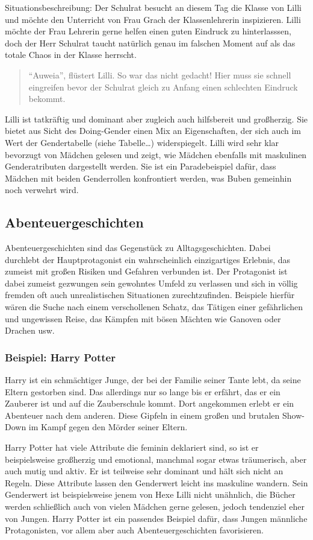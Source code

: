 Situationsbeschreibung: Der Schulrat besucht an diesem Tag die Klasse
von Lilli und möchte den Unterricht von Frau Grach der Klassenlehrerin
inspizieren. Lilli möchte der Frau Lehrerin gerne helfen einen guten
Eindruck zu hinterlasssen, doch der Herr Schulrat taucht natürlich genau
im falschen Moment auf als das totale Chaos in der Klasse herrscht.
\blockcquote[47]{KNISTER1999}{\enquote{Auweia}, flüstert Lilli. So war das nicht gedacht! Hier muss sie schnell eingreifen bevor der Schulrat gleich zu Anfang einen schlechten Eindruck bekommt.}
Lilli ist tatkräftig und dominant aber zugleich auch hilfsbereit und
großherzig. Sie bietet aus Sicht des Doing-Gender einen Mix an
Eigenschaften, der sich auch im Wert der Gendertabelle (siehe
Tabelle\ldots{}) widerspiegelt. Lilli wird sehr klar bevorzugt von
Mädchen gelesen und zeigt, wie Mädchen ebenfalls mit maskulinen
Genderatributen dargestellt werden. Sie ist ein Paradebeispiel dafür,
dass Mädchen mit beiden Genderrollen konfrontiert werden, was Buben
gemeinhin noch verwehrt wird.

\subsection{Abenteuergeschichten}

Abenteuergeschichten sind das Gegenstück zu Alltagsgeschichten. Dabei
durchlebt der Hauptprotagonist ein wahrscheinlich einzigartiges
Erlebnis, das zumeist mit großen Risiken und Gefahren verbunden ist. Der
Protagonist ist dabei zumeist gezwungen sein gewohntes Umfeld zu
verlassen und sich in völlig fremden oft auch unrealistischen
Situationen zurechtzufinden. Beispiele hierfür wären die Suche nach
einem verschollenen Schatz, das Tätigen einer gefährlichen und
ungewissen Reise, das Kämpfen mit bösen Mächten wie Ganoven oder Drachen
usw.

\subsubsection{Beispiel: Harry Potter}

Harry ist ein schmächtiger Junge, der bei der Familie seiner Tante lebt,
da seine Eltern gestorben sind. Das allerdings nur so lange bis er
erfährt, das er ein Zauberer ist und auf die Zauberschule kommt. Dort
angekommen erlebt er ein Abenteuer nach dem anderen. Diese Gipfeln in
einem großen und brutalen Show-Down im Kampf gegen den Mörder seiner
Eltern. \parencite{Rowling1998}

Harry Potter hat viele Attribute die feminin deklariert sind, so ist er
beispielsweise großherzig und emotional, manchmal sogar etwas
träumerisch, aber auch mutig und aktiv. Er ist teilweise sehr dominant
und hält sich nicht an Regeln. Diese Attribute lassen den Genderwert
leicht ins maskuline wandern. Sein Genderwert ist beispielsweise jenem
von Hexe Lilli nicht unähnlich, die Bücher werden schließlich auch von
vielen Mädchen gerne gelesen, jedoch tendenziel eher von Jungen. Harry
Potter ist ein passendes Beispiel dafür, dass Jungen männliche
Protagonisten, vor allem aber auch Abenteuergeschichten favorisieren.

